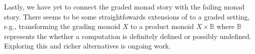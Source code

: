 \documentclass[preprint,sigplan]{acmart}
\begin{document}
Lastly, we have yet to connect the graded monad story with the
failing monad story. There seems to be some straightfowards
extensions of  to a graded setting, e.g., transforming
the grading monoid $X$ to a product monoid $X \times \mathbb{B}$ where
$\mathbb{B}$ represents the whether a computation is definitely
defined or possibly undefined. Exploring this and richer alternatives
is ongoing work.





\end{document}
